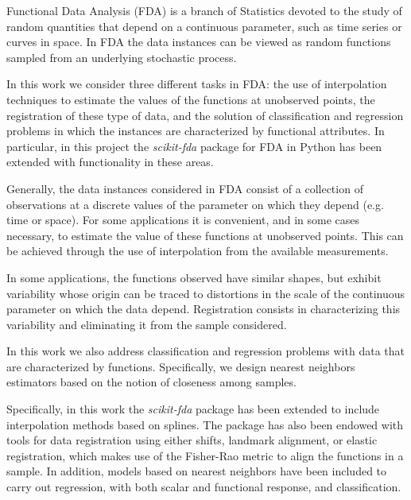 Functional Data Analysis (FDA) is a branch of Statistics devoted
to the study of random quantities that depend on a continuous parameter,
such as time series or curves in space.
In FDA the data instances can be viewed as random functions
sampled from an underlying stochastic process.

In this work we consider three different tasks in FDA:
the use of interpolation techniques to estimate the values
of the functions at unobserved points,
the registration of these type of data,
and the solution of classification and regression problems in which
the instances are characterized by functional attributes.
In particular, in this project the \textit{scikit-fda} package
for FDA in Python has been extended
with functionality in these areas.

Generally, the data instances considered in FDA consist of a
collection of observations at a discrete values of the parameter
on which they depend (e.g. time or space).
For some applications it is convenient, and in some cases
necessary, to estimate the value of these functions
at unobserved points.
This can be achieved through the use of interpolation
from the available measurements.

In some applications, the functions observed
have similar shapes, but exhibit variability whose
origin can be traced to distortions in the scale
of the continuous parameter on which the data depend.
Registration consists in characterizing
this variability and eliminating it from the sample considered.

In this work we also address classification and regression problems
with data that are characterized by functions.
Specifically, we design nearest neighbors estimators
based on the notion of closeness among samples.

Specifically, in this work
the \textit{scikit-fda} package has been extended
to include interpolation methods based on splines.
The package has also been endowed with tools
for data registration using either shifts,
landmark alignment, or elastic registration,
which makes use of the Fisher-Rao metric
to align the functions in a sample.
In addition, models based on nearest neighbors
have been included to carry out regression, with both scalar and functional
response, and classification.
